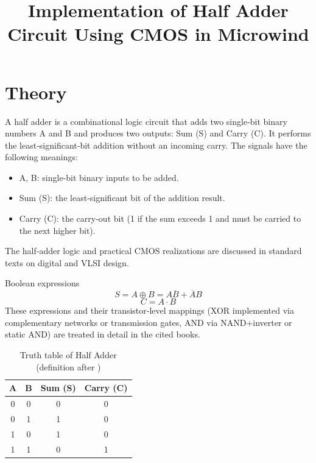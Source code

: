 \documentclass[12pt]{article}
\title{Implementation of Half Adder Circuit Using CMOS in Microwind}
\author{}
\date{}
\begin{document}


\pagebreak

\tableofcontents

\pagebreak
{}
\maketitle

\section*{Theory}
A half adder is a combinational logic circuit that adds two single‑bit binary numbers A and B and produces two outputs: Sum (S) and Carry (C). It performs the least‑significant‑bit addition without an incoming carry. The signals have the following meanings:
\begin{itemize}
  \item A, B: single‑bit binary inputs to be added.
  \item Sum (S): the least‑significant bit of the addition result.
  \item Carry (C): the carry‑out bit (1 if the sum exceeds 1 and must be carried to the next higher bit).
\end{itemize}

The half‑adder logic and practical CMOS realizations are discussed in standard texts on digital and VLSI design\cite{weste2011cmos,rabaey2003digital,sedra2015microelectronic}.

Boolean expressions
\[
  S = A \oplus B = A\overline{B} + \overline{A}B
\]
\[
  C = A \cdot B
\]
These expressions and their transistor‑level mappings (XOR implemented via complementary networks or transmission gates, AND via NAND+inverter or static AND) are treated in detail in the cited books\cite{rabaey2003digital,weste2011cmos}.

\begin{table}[H]
  \centering
  \begin{tabular}{|c c |c |c|}
    \hline
    A & B & Sum (S) & Carry (C) \\
    \hline
    0 & 0 & 0       & 0         \\
    0 & 1 & 1       & 0         \\
    1 & 0 & 1       & 0         \\
    1 & 1 & 0       & 1         \\
    \hline
  \end{tabular}
  \caption*{Truth table of Half Adder (definition after \cite{sedra2015microelectronic})}
\end{table}
\end{document}
